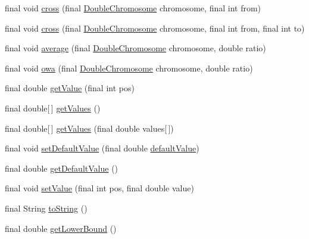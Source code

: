\begin{DoxyCompactItemize}
\item 
final void \hyperlink{classjenes_1_1chromosome_1_1_double_chromosome_a0461bfc35a8ca0c503ba0a4017005f89}{cross} (final \hyperlink{classjenes_1_1chromosome_1_1_double_chromosome}{Double\-Chromosome} chromosome, final int from)
\item 
final void \hyperlink{classjenes_1_1chromosome_1_1_double_chromosome_acaad58427cf1db8071fe2032755bbdce}{cross} (final \hyperlink{classjenes_1_1chromosome_1_1_double_chromosome}{Double\-Chromosome} chromosome, final int from, final int to)
\item 
final void \hyperlink{classjenes_1_1chromosome_1_1_double_chromosome_a83b26a42b307ce1316523e262f044fdd}{average} (final \hyperlink{classjenes_1_1chromosome_1_1_double_chromosome}{Double\-Chromosome} chromosome, double ratio)
\item 
final void \hyperlink{classjenes_1_1chromosome_1_1_double_chromosome_aeebe5bd21dbc2e8dbbdc135d4d10a4cc}{owa} (final \hyperlink{classjenes_1_1chromosome_1_1_double_chromosome}{Double\-Chromosome} chromosome, double ratio)
\item 
final double \hyperlink{classjenes_1_1chromosome_1_1_double_chromosome_acb68cbcac3e7859d4f380530355012c8}{get\-Value} (final int pos)
\item 
final double\mbox{[}$\,$\mbox{]} \hyperlink{classjenes_1_1chromosome_1_1_double_chromosome_a3dea8e4aee9041437b101d1f74d10d1f}{get\-Values} ()
\item 
final double\mbox{[}$\,$\mbox{]} \hyperlink{classjenes_1_1chromosome_1_1_double_chromosome_a0e7543f12f4ab7591f9b4687c44c801c}{get\-Values} (final double values\mbox{[}$\,$\mbox{]})
\item 
final void \hyperlink{classjenes_1_1chromosome_1_1_double_chromosome_ab0f087d0d5ac5ac273c63c4e3af2efff}{set\-Default\-Value} (final double \hyperlink{classjenes_1_1chromosome_1_1_double_chromosome_a5c2d56f7d05b08c75013a7529ae46839}{default\-Value})
\item 
final double \hyperlink{classjenes_1_1chromosome_1_1_double_chromosome_ae129a0daa2e01593859f5b26c508d36b}{get\-Default\-Value} ()
\item 
final void \hyperlink{classjenes_1_1chromosome_1_1_double_chromosome_a4581d7735d8ed661473b0e72ff19f956}{set\-Value} (final int pos, final double value)
\item 
final String \hyperlink{classjenes_1_1chromosome_1_1_double_chromosome_aeaf1116586c3fac1fa8c1dad28b7f727}{to\-String} ()
\item 
final double \hyperlink{classjenes_1_1chromosome_1_1_double_chromosome_aa45c550b4cb16cba001dd6c754a5d8bd}{get\-Lower\-Bound} ()

\end{DoxyCompactItemize}
